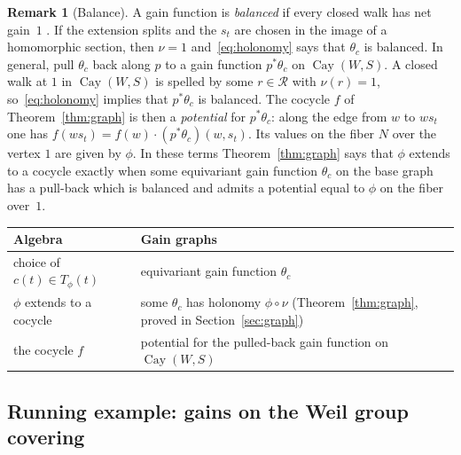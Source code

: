 \documentclass[12pt,letterpaper]{article}
\numberwithin{equation}{section}
\theoremstyle{plain}
\theoremstyle{definition}
\newtheorem{remark}[theorem]{Remark}
\newcommand{\rel}{\mathcal{R}}            %
\DeclareMathOperator{\Cay}{Cay}
\begin{document}
\begin{remark}[Balance]\label{rem:balance}
A gain function is \emph{balanced} if every closed walk has net gain~$1$
\cite{Za89}. If the extension splits and the $s_t$ are chosen in the image
of a homomorphic section, then $\nu=1$ and~\eqref{eq:holonomy} says that
$\theta_c$ is balanced. In general, pull $\theta_c$ back along $p$ to a
gain function $p^*\theta_c$ on $\Cay(W,S)$. A closed walk at $1$ in
$\Cay(W,S)$ is spelled by some $r\in\rel$ with $\nu(r)=1$,
so~\eqref{eq:holonomy} implies that $p^*\theta_c$ is balanced. The cocycle
$f$ of Theorem~\ref{thm:graph} is then a \emph{potential} for
$p^*\theta_c$: along the edge from $w$ to $ws_t$ one has
$f(ws_t)=f(w)\cdot(p^*\theta_c)(w,s_t)$. Its values on the fiber $N$ over
the vertex $1$ are given by $\phi$. In these terms
Theorem~\ref{thm:graph} says that $\phi$ extends to a cocycle exactly when
some equivariant gain function $\theta_c$ on the base graph has a
pull-back which is balanced and admits a potential equal to $\phi$ on the
fiber over~$1$.
\end{remark}

\begin{center}
\begin{tabular}{@{}p{}p{}@{}}
\toprule
Algebra & Gain graphs \\
\midrule
choice of $c(t)\in T_\phi(t)$ & equivariant gain function $\theta_c$ \\
$\phi$ extends to a cocycle & some $\theta_c$ has holonomy $\phi\circ\nu$
(Theorem~\ref{thm:graph}, proved in Section~\ref{sec:graph}) \\
the cocycle $f$ & potential for the pulled-back gain function on
$\Cay(W,S)$ \\
\bottomrule
\end{tabular}
\end{center}

\subsection{Running example: gains on the Weil group covering}\label{ss:run4}
\end{document}
